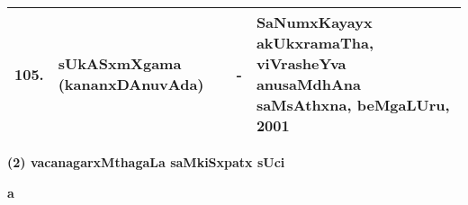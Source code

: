 {\begin{longtable}{rp{6cm}cp{9cm}<{\raggedright}@{}}
105. & sUkASxmXgama (kananxDAnuvAda) &-& SaNumxKayayx akUkxramaTha, viVrasheYva anusaMdhAna saMsAthxna, beMgaLUru, 2001\\
\hline
\end{longtable}}


\vskip 1.2cm

\begin{center}
{\large\bf (2) vacanagarxMthagaLa saMkiSxpatx sUci}
\end{center}

\medskip

\centerline{\bf a}

\smallskip

